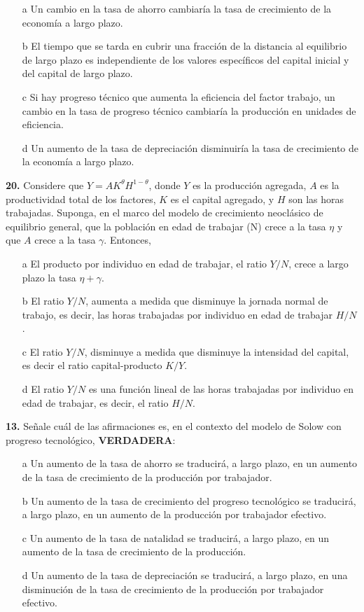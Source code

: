 \documentclass{nuevotema}
\begin{document}
\begin{itemize}
	\item[a] Un cambio en la tasa de ahorro cambiaría la tasa de crecimiento de la economía a largo plazo.
	\item[b] El tiempo que se tarda en cubrir una fracción de la distancia al equilibrio de largo plazo es independiente de los valores específicos del capital inicial y del capital de largo plazo.
	\item[c] Si hay progreso técnico que aumenta la eficiencia del factor trabajo, un cambio en la tasa de progreso técnico cambiaría la producción en unidades de eficiencia.
	\item[d] Un aumento de la tasa de depreciación disminuiría la tasa de crecimiento de la economía a largo plazo.
\end{itemize}

\textbf{20.} Considere que $Y = AK^\theta H^{1-\theta}$, donde $Y$ es la producción agregada, $A$ es la productividad total de los factores, $K$ es el capital agregado, y $H$ son las horas trabajadas. Suponga, en el marco del modelo de crecimiento neoclásico de equilibrio general, que la población en edad de trabajar (N) crece a la tasa $\eta$ y que $A$ crece a la tasa $\gamma$. Entonces, 

\begin{itemize}
	\item[a] El producto por individuo en edad de trabajar, el ratio $Y/N$, crece a largo plazo la tasa $\eta+\gamma$.
	\item[b] El ratio $Y/N$, aumenta a medida que disminuye la jornada normal de trabajo, es decir, las horas trabajadas por individuo en edad de trabajar $H/N$.
	\item[c] El ratio $Y/N$, disminuye a medida que disminuye la intensidad del capital, es decir el ratio capital-producto $K/Y$.
	\item[d] El ratio $Y/N$ es una función lineal de las horas trabajadas por individuo en edad de trabajar, es decir, el ratio $H/N$.
\end{itemize}


\textbf{13.} Señale cuál de las afirmaciones es, en el contexto del modelo de Solow con progreso tecnológico, \textbf{VERDADERA}:

\begin{itemize}
	\item[a] Un aumento de la tasa de ahorro se traducirá, a largo plazo, en un aumento de la tasa de crecimiento de la producción por trabajador.
	\item[b] Un aumento de la tasa de crecimiento del progreso tecnológico se traducirá, a largo plazo, en un aumento de la producción por trabajador efectivo.
	\item[c] Un aumento de la tasa de natalidad se traducirá, a largo plazo, en un aumento de la tasa de crecimiento de la producción.
	\item[d] Un aumento de la tasa de depreciación se traducirá, a largo plazo, en una disminución de la tasa de crecimiento de la producción por trabajador efectivo.
\end{itemize}
\end{document}
